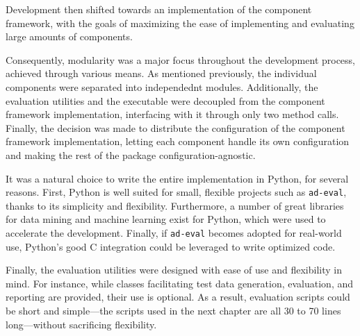 Development then shifted towards an implementation of the component framework, with the goals of maximizing the ease of implementing and evaluating large amounts of components.

Consequently, modularity was a major focus throughout the development process, achieved through various means. As mentioned previously, the individual components were separated into independednt modules. Additionally, the evaluation utilities and the executable were decoupled from the component framework implementation, interfacing with it through only two method calls. Finally, the decision was made to distribute the configuration of the component framework implementation, letting each component handle its own configuration and making the rest of the package configuration-agnostic.

It was a natural choice to write the entire implementation in Python, for several reasons. First, Python is well suited for small, flexible projects such as \texttt{ad-eval}, thanks to its simplicity and flexibility. Furthermore, a number of great libraries for data mining and machine learning exist for Python, which were used to accelerate the development. Finally, if \texttt{ad-eval} becomes adopted for real-world use, Python's good C integration could be leveraged to write optimized code. 

Finally, the evaluation utilities were designed with ease of use and flexibility in mind. For instance, while classes facilitating test data generation, evaluation, and reporting are provided, their use is optional. As a result, evaluation scripts could be short and simple---the scripts used in the next chapter are all 30 to 70 lines long---without sacrificing flexibility.
